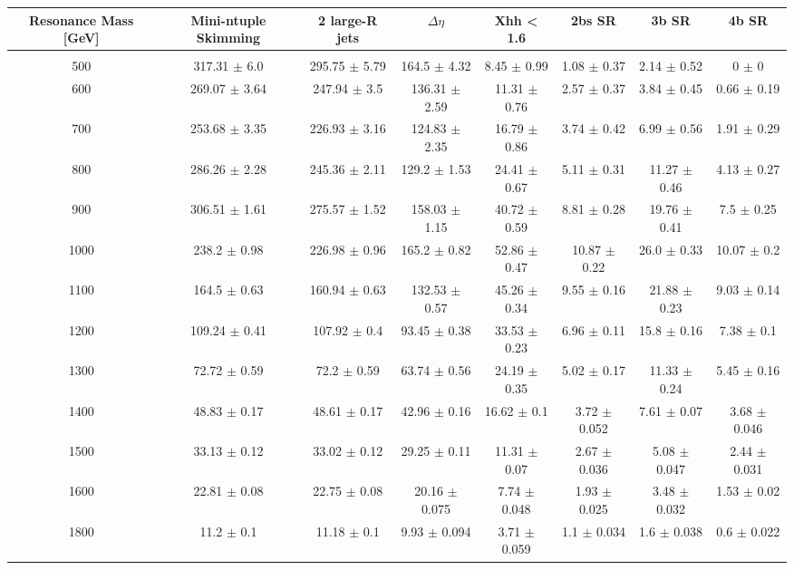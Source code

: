 \begin{footnotesize} 
\begin{tabular}{c|c|c|c|c|c|c|c} 
Resonance Mass [GeV] & Mini-ntuple Skimming & 2 large-R jets & $\Delta\eta$ & Xhh < 1.6 & 2bs SR & 3b SR & 4b SR \\ 
\hline\hline 
& & & & & & &\\ 
500 & 317.31 $\pm$ 6.0 & 295.75 $\pm$ 5.79 & 164.5 $\pm$ 4.32 & 8.45 $\pm$ 0.99 & 1.08 $\pm$ 0.37 & 2.14 $\pm$ 0.52 & 0 $\pm$ 0\\ 
600 & 269.07 $\pm$ 3.64 & 247.94 $\pm$ 3.5 & 136.31 $\pm$ 2.59 & 11.31 $\pm$ 0.76 & 2.57 $\pm$ 0.37 & 3.84 $\pm$ 0.45 & 0.66 $\pm$ 0.19\\ 
700 & 253.68 $\pm$ 3.35 & 226.93 $\pm$ 3.16 & 124.83 $\pm$ 2.35 & 16.79 $\pm$ 0.86 & 3.74 $\pm$ 0.42 & 6.99 $\pm$ 0.56 & 1.91 $\pm$ 0.29\\ 
800 & 286.26 $\pm$ 2.28 & 245.36 $\pm$ 2.11 & 129.2 $\pm$ 1.53 & 24.41 $\pm$ 0.67 & 5.11 $\pm$ 0.31 & 11.27 $\pm$ 0.46 & 4.13 $\pm$ 0.27\\ 
900 & 306.51 $\pm$ 1.61 & 275.57 $\pm$ 1.52 & 158.03 $\pm$ 1.15 & 40.72 $\pm$ 0.59 & 8.81 $\pm$ 0.28 & 19.76 $\pm$ 0.41 & 7.5 $\pm$ 0.25\\ 
1000 & 238.2 $\pm$ 0.98 & 226.98 $\pm$ 0.96 & 165.2 $\pm$ 0.82 & 52.86 $\pm$ 0.47 & 10.87 $\pm$ 0.22 & 26.0 $\pm$ 0.33 & 10.07 $\pm$ 0.2\\ 
1100 & 164.5 $\pm$ 0.63 & 160.94 $\pm$ 0.63 & 132.53 $\pm$ 0.57 & 45.26 $\pm$ 0.34 & 9.55 $\pm$ 0.16 & 21.88 $\pm$ 0.23 & 9.03 $\pm$ 0.14\\ 
1200 & 109.24 $\pm$ 0.41 & 107.92 $\pm$ 0.4 & 93.45 $\pm$ 0.38 & 33.53 $\pm$ 0.23 & 6.96 $\pm$ 0.11 & 15.8 $\pm$ 0.16 & 7.38 $\pm$ 0.1\\ 
1300 & 72.72 $\pm$ 0.59 & 72.2 $\pm$ 0.59 & 63.74 $\pm$ 0.56 & 24.19 $\pm$ 0.35 & 5.02 $\pm$ 0.17 & 11.33 $\pm$ 0.24 & 5.45 $\pm$ 0.16\\ 
1400 & 48.83 $\pm$ 0.17 & 48.61 $\pm$ 0.17 & 42.96 $\pm$ 0.16 & 16.62 $\pm$ 0.1 & 3.72 $\pm$ 0.052 & 7.61 $\pm$ 0.07 & 3.68 $\pm$ 0.046\\ 
1500 & 33.13 $\pm$ 0.12 & 33.02 $\pm$ 0.12 & 29.25 $\pm$ 0.11 & 11.31 $\pm$ 0.07 & 2.67 $\pm$ 0.036 & 5.08 $\pm$ 0.047 & 2.44 $\pm$ 0.031\\ 
1600 & 22.81 $\pm$ 0.08 & 22.75 $\pm$ 0.08 & 20.16 $\pm$ 0.075 & 7.74 $\pm$ 0.048 & 1.93 $\pm$ 0.025 & 3.48 $\pm$ 0.032 & 1.53 $\pm$ 0.02\\ 
1800 & 11.2 $\pm$ 0.1 & 11.18 $\pm$ 0.1 & 9.93 $\pm$ 0.094 & 3.71 $\pm$ 0.059 & 1.1 $\pm$ 0.034 & 1.6 $\pm$ 0.038 & 0.6 $\pm$ 0.022\\ 

\end{tabular}
\end{footnotesize}
